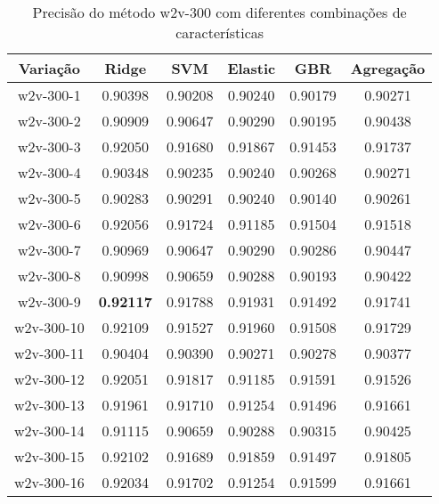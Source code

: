 \begin{table}[H]
\centering
\begin{tabular}{|c| c c  c  c  c| }
\hline
Variação &  Ridge & SVM & Elastic & GBR & Agregação  \\ 
\hline
w2v-300-1 & 0.90398 & 0.90208 & 0.90240 & 0.90179 & 0.90271 \\
\hline
w2v-300-2 & 0.90909 & 0.90647 & 0.90290 & 0.90195 & 0.90438 \\
\hline
w2v-300-3 & 0.92050 & 0.91680 & 0.91867 & 0.91453 & 0.91737 \\
\hline
w2v-300-4 & 0.90348 & 0.90235 & 0.90240 & 0.90268 & 0.90271 \\
\hline
w2v-300-5 & 0.90283 & 0.90291 & 0.90240 & 0.90140 & 0.90261 \\
\hline
w2v-300-6 & 0.92056 & 0.91724 & 0.91185 & 0.91504 & 0.91518 \\
\hline
w2v-300-7 & 0.90969 & 0.90647 & 0.90290 & 0.90286 & 0.90447 \\
\hline
w2v-300-8 & 0.90998 & 0.90659 & 0.90288 & 0.90193 & 0.90422 \\
\hline
w2v-300-9 & \textbf{0.92117} & 0.91788 & 0.91931 & 0.91492 & 0.91741 \\
\hline
w2v-300-10 & 0.92109 & 0.91527 & 0.91960 & 0.91508 & 0.91729 \\
\hline
w2v-300-11 & 0.90404 & 0.90390 & 0.90271 & 0.90278 & 0.90377 \\
\hline
w2v-300-12 & 0.92051 & 0.91817 & 0.91185 & 0.91591 & 0.91526 \\
\hline
w2v-300-13 & 0.91961 & 0.91710 & 0.91254 & 0.91496 & 0.91661 \\
\hline
w2v-300-14 & 0.91115 & 0.90659 & 0.90288 & 0.90315 & 0.90425 \\
\hline
w2v-300-15 & 0.92102 & 0.91689 & 0.91859 & 0.91497 & 0.91805 \\
\hline
w2v-300-16 & 0.92034 & 0.91702 & 0.91254 & 0.91599 & 0.91661 \\
\hline
\end{tabular}
\caption{Precisão do método w2v-300 com diferentes combinações de características}
\label{tab:precisionw2v300}
\end{table}

